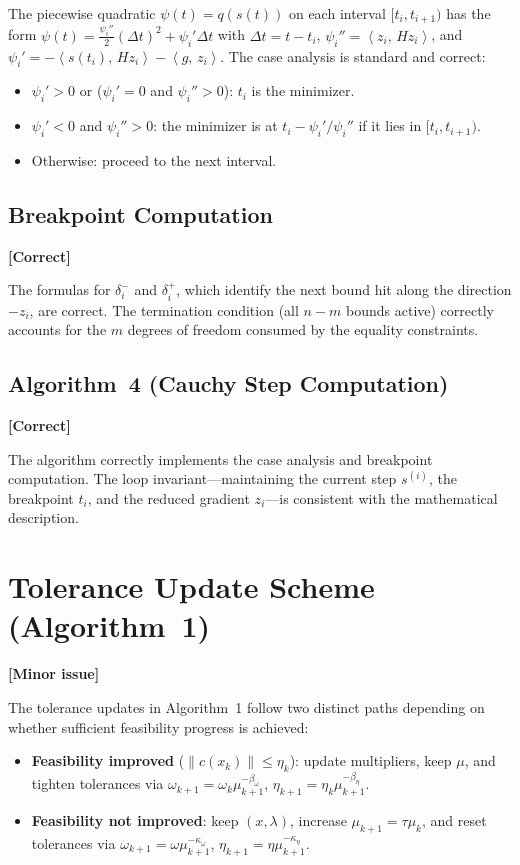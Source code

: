 \documentclass[11pt]{article}
\newcommand{\inner}[2]{\left\langle #1,\, #2 \right\rangle}
\newcommand{\statusok}{\textcolor{okcolor}{\textbf{[Correct]}}}
\newcommand{\statuswarn}{\textcolor{warncolor}{\textbf{[Minor issue]}}}
\theoremstyle{plain}
\begin{document}
The piecewise quadratic $\psi(t) = q(s(t))$ on each interval $[t_i, t_{i+1})$ has the form $\psi(t) = \frac{\psi_i''}{2}(\Delta t)^2 + \psi_i'\Delta t$ with $\Delta t = t - t_i$, $\psi_i'' = \inner{z_i}{Hz_i}$, and $\psi_i' = -\inner{s(t_i)}{Hz_i} - \inner{g}{z_i}$. The case analysis is standard and correct:

\begin{itemize}
  \item $\psi_i' > 0$ or ($\psi_i' = 0$ and $\psi_i'' > 0$): $t_i$ is the minimizer.
  \item $\psi_i' < 0$ and $\psi_i'' > 0$: the minimizer is at $t_i - \psi_i'/\psi_i''$ if it lies in $[t_i, t_{i+1})$.
  \item Otherwise: proceed to the next interval.
\end{itemize}

\subsection{Breakpoint Computation}
\statusok

The formulas for $\delta_i^-$ and $\delta_i^+$, which identify the next bound hit along the direction $-z_i$, are correct. The termination condition (all $n - m$ bounds active) correctly accounts for the $m$ degrees of freedom consumed by the equality constraints.

\subsection{Algorithm~4 (Cauchy Step Computation)}
\statusok

The algorithm correctly implements the case analysis and breakpoint computation. The loop invariant---maintaining the current step $s^{(i)}$, the breakpoint $t_i$, and the reduced gradient $z_i$---is consistent with the mathematical description.

\section{Tolerance Update Scheme (Algorithm~1)}
\statuswarn

The tolerance updates in Algorithm~1 follow two distinct paths depending on whether sufficient feasibility progress is achieved:

\begin{itemize}
  \item \textbf{Feasibility improved} ($\|c(x_k)\| \le \eta_k$): update multipliers, keep $\mu$, and tighten tolerances via $\omega_{k+1} = \omega_k\mu_{k+1}^{-\beta_\omega}$, $\eta_{k+1} = \eta_k\mu_{k+1}^{-\beta_\eta}$.
  \item \textbf{Feasibility not improved}: keep $(x,\lambda)$, increase $\mu_{k+1} = \tau\mu_k$, and reset tolerances via $\omega_{k+1} = \omega\mu_{k+1}^{-\kappa_\omega}$, $\eta_{k+1} = \eta\mu_{k+1}^{-\kappa_\eta}$.
\end{itemize}
\end{document}
